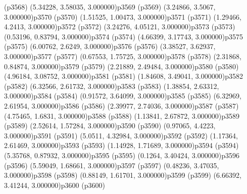 \psdot(p3568)
\psPoint(5.34228, 3.58035, 3.000000){p3569}
\psdot(p3569)
\psPoint(3.24866, 3.5067, 3.000000){p3570}
\psdot(p3570)
\psPoint(1.51525, 1.00473, 3.000000){p3571}
\psdot(p3571)
\psPoint(1.29466, 4.2413, 3.000000){p3572}
\psdot(p3572)
\psPoint(3.24276, 4.05121, 3.000000){p3573}
\psdot(p3573)
\psPoint(0.53196, 0.83794, 3.000000){p3574}
\psdot(p3574)
\psPoint(4.66399, 3.17743, 3.000000){p3575}
\psdot(p3575)
\psPoint(6.00762, 2.6249, 3.000000){p3576}
\psdot(p3576)
\psPoint(3.38527, 3.62937, 3.000000){p3577}
\psdot(p3577)
\psPoint(0.67553, 1.75725, 3.000000){p3578}
\psdot(p3578)
\psPoint(2.31868, 0.84874, 3.000000){p3579}
\psdot(p3579)
\psPoint(2.21889, 2.49484, 3.000000){p3580}
\psdot(p3580)
\psPoint(4.96184, 3.08752, 3.000000){p3581}
\psdot(p3581)
\psPoint(1.84608, 3.49041, 3.000000){p3582}
\psdot(p3582)
\psPoint(6.32566, 2.61732, 3.000000){p3583}
\psdot(p3583)
\psPoint(1.38854, 2.63312, 3.000000){p3584}
\psdot(p3584)
\psPoint(0.91572, 3.64099, 3.000000){p3585}
\psdot(p3585)
\psPoint(6.32969, 2.61954, 3.000000){p3586}
\psdot(p3586)
\psPoint(2.39977, 2.74036, 3.000000){p3587}
\psdot(p3587)
\psPoint(4.75465, 1.6831, 3.000000){p3588}
\psdot(p3588)
\psPoint(1.13841, 2.67872, 3.000000){p3589}
\psdot(p3589)
\psPoint(2.52614, 1.57284, 3.000000){p3590}
\psdot(p3590)
\psPoint(0.97065, 4.4223, 3.000000){p3591}
\psdot(p3591)
\psPoint(5.0511, 4.32984, 3.000000){p3592}
\psdot(p3592)
\psPoint(1.17364, 2.61469, 3.000000){p3593}
\psdot(p3593)
\psPoint(1.14928, 1.71689, 3.000000){p3594}
\psdot(p3594)
\psPoint(5.35768, 0.87932, 3.000000){p3595}
\psdot(p3595)
\psPoint(0.1264, 3.40424, 3.000000){p3596}
\psdot(p3596)
\psPoint(5.59049, 1.68661, 3.000000){p3597}
\psdot(p3597)
\psPoint(0.48236, 3.47035, 3.000000){p3598}
\psdot(p3598)
\psPoint(0.88149, 1.61701, 3.000000){p3599}
\psdot(p3599)
\psPoint(6.66392, 3.41244, 3.000000){p3600}
\psdot(p3600)
